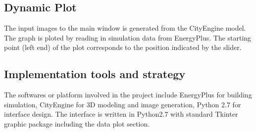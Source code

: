 \subsection {Dynamic Plot}
The input images to the main window is generated from the CityEngine
model. The graph is ploted by reading in simulation data from
EnergyPlus. The starting point (left end) of the plot corresponds to
the position indicated by the slider. 

\subsection {Implementation tools and strategy}
The softwares or platform involved in the project include EnergyPlus
for building simulation, CityEngine for 3D modeling and image
generation, Python 2.7 for interface design. The interface is written
in Python2.7 with standard Tkinter graphic package including the data
plot section.
